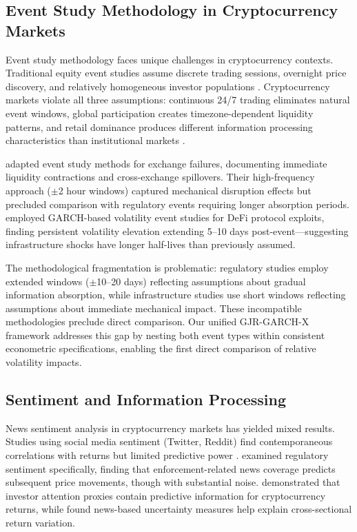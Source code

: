 \documentclass[pdflatex,sn-mathphys-num]{sn-jnl}
\theoremstyle{thmstyleone}
\theoremstyle{thmstyletwo}
\theoremstyle{thmstylethree}
\begin{document}
\subsection{Event Study Methodology in Cryptocurrency Markets}

Event study methodology faces unique challenges in cryptocurrency contexts. Traditional equity event studies assume discrete trading sessions, overnight price discovery, and relatively homogeneous investor populations \citep{CampbellEtAl1997, mackinlay1997}. Cryptocurrency markets violate all three assumptions: continuous 24/7 trading eliminates natural event windows, global participation creates timezone-dependent liquidity patterns, and retail dominance produces different information processing characteristics than institutional markets \citep{GlaserEtAl2014}.

\citet{ChenEtAl2023} adapted event study methods for exchange failures, documenting immediate liquidity contractions and cross-exchange spillovers. Their high-frequency approach ($\pm$2 hour windows) captured mechanical disruption effects but precluded comparison with regulatory events requiring longer absorption periods. \citet{Grobys2021} employed GARCH-based volatility event studies for DeFi protocol exploits, finding persistent volatility elevation extending 5--10 days post-event---suggesting infrastructure shocks have longer half-lives than previously assumed.

The methodological fragmentation is problematic: regulatory studies employ extended windows ($\pm$10--20 days) reflecting assumptions about gradual information absorption, while infrastructure studies use short windows reflecting assumptions about immediate mechanical impact. These incompatible methodologies preclude direct comparison. Our unified GJR-GARCH-X framework addresses this gap by nesting both event types within consistent econometric specifications, enabling the first direct comparison of relative volatility impacts.

\subsection{Sentiment and Information Processing}

News sentiment analysis in cryptocurrency markets has yielded mixed results. Studies using social media sentiment (Twitter, Reddit) find contemporaneous correlations with returns but limited predictive power \citep{ShenEtAl2019, PhillipsGorse2018}. \citet{FeinsteinWerbach2021} examined regulatory sentiment specifically, finding that enforcement-related news coverage predicts subsequent price movements, though with substantial noise. \citet{LiuTsyvinski2021} demonstrated that investor attention proxies contain predictive information for cryptocurrency returns, while \citet{WaltherEtAl2019} found news-based uncertainty measures help explain cross-sectional return variation.
\end{document}
